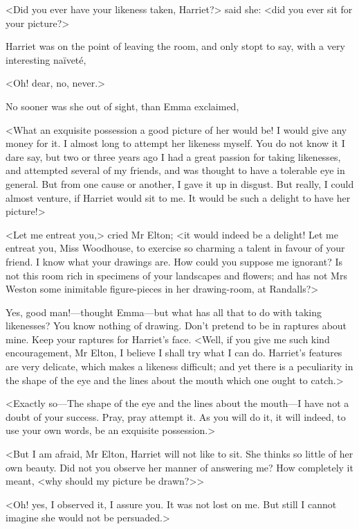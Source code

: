 <Did you ever have your likeness taken, Harriet?> said she: <did you ever sit for your picture?>

Harriet was on the point of leaving the room, and only stopt to say, with a very interesting naïveté,

<Oh! dear, no, never.>

No sooner was she out of sight, than Emma exclaimed,

<What an exquisite possession a good picture of her would be! I would give any money for it. I almost long to attempt her likeness myself. You do not know it I dare say, but two or three years ago I had a great passion for taking likenesses, and attempted several of my friends, and was thought to have a tolerable eye in general. But from one cause or another, I gave it up in disgust. But really, I could almost venture, if Harriet would sit to me. It would be such a delight to have her picture!>

<Let me entreat you,> cried Mr Elton; <it would indeed be a delight! Let me entreat you, Miss Woodhouse, to exercise so charming a talent in favour of your friend. I know what your drawings are. How could you suppose me ignorant? Is not this room rich in specimens of your landscapes and flowers; and has not Mrs Weston some inimitable figure-pieces in her drawing-room, at Randalls?>

Yes, good man!—thought Emma—but what has all that to do with taking likenesses? You know nothing of drawing. Don't pretend to be in raptures about mine. Keep your raptures for Harriet's face. <Well, if you give me such kind encouragement, Mr Elton, I believe I shall try what I can do. Harriet's features are very delicate, which makes a likeness difficult; and yet there is a peculiarity in the shape of the eye and the lines about the mouth which one ought to catch.>

<Exactly so—The shape of the eye and the lines about the mouth—I have not a doubt of your success. Pray, pray attempt it. As you will do it, it will indeed, to use your own words, be an exquisite possession.>

<But I am afraid, Mr Elton, Harriet will not like to sit. She thinks so little of her own beauty. Did not you observe her manner of answering me? How completely it meant, <why should my picture be drawn?>>

<Oh! yes, I observed it, I assure you. It was not lost on me. But still I cannot imagine she would not be persuaded.>

